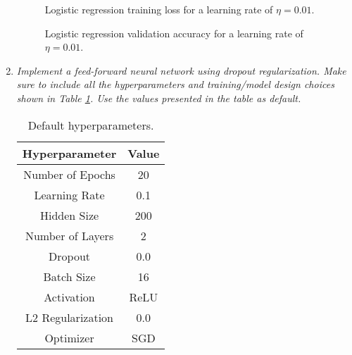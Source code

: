 \documentclass[12pt]{article}
\begin{document}
\begin{enumerate}[leftmargin=\labelsep]
          \begin{figure}[H]
              \centering
              
              \caption{Logistic regression training loss for a learning rate of $\eta = 0.01$.}
              \label{fig:q2-logistic_regression-training-loss-batch-16-lr-0.01-epochs-20-l2-0.0-opt-sgd}
          \end{figure}

          \begin{figure}[H]
              \centering
              
              \caption{Logistic regression validation accuracy for a learning rate of $\eta = 0.01$.}
              \label{fig:q2-logistic_regression-validation-accuracy-batch-16-lr-0.01-epochs-20-l2-0.0-opt-sgd}
          \end{figure}

          \vspace{12pt}

    \item \textit{Implement a feed-forward neural network using dropout regularization. Make
              sure to include all the hyperparameters and training/model design choices shown in Table
                  {\ref{tab:mlp-default}}. Use the values presented in the table as default.}

          \begin{table}[H]
              \centering
              \begin{tabular}{|c|c|}
                  \hline
                  \textbf{Hyperparameter} & \textbf{Value} \\ \hline
                  Number of Epochs        & 20             \\ \hline
                  Learning Rate           & 0.1            \\ \hline
                  Hidden Size             & 200            \\ \hline
                  Number of Layers        & 2              \\ \hline
                  Dropout                 & 0.0            \\ \hline
                  Batch Size              & 16             \\ \hline
                  Activation              & ReLU           \\ \hline
                  L2 Regularization       & 0.0            \\ \hline
                  Optimizer               & SGD            \\ \hline
              \end{tabular}
              \caption{Default hyperparameters.}
              \label{tab:mlp-default}
          \end{table}


\end{enumerate}
\end{document}
